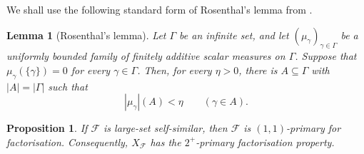 \documentclass[11pt]{amsart}
\theoremstyle{plain}
\newtheorem{lemma}[theorem]{Lemma}
\newtheorem{proposition}[theorem]{Proposition}
\theoremstyle{definition}
\numberwithin{equation}{section}
\begin{document}
We shall use the following standard form of Rosenthal's lemma from \cite{Rosenthal1970}.

\begin{lemma}[Rosenthal's lemma]\label{lem:rosenthal}
Let \(\Gamma\) be an infinite set, and let
\((\mu_\gamma)_{\gamma\in\Gamma}\) be a uniformly bounded family of finitely additive scalar measures on \(\Gamma\).  Suppose that
\(\mu_\gamma(\{\gamma\})=0\) for every \(\gamma\in\Gamma\).  Then, for every \(\eta>0\), there is \(A\subseteq\Gamma\) with \(|A|=|\Gamma|\) such that
\[
    |\mu_\gamma|(A)<\eta
    \qquad(\gamma\in A).
\]
\end{lemma}

\begin{proposition}\label{prop:large-set-self-similar-implies-diagonal-primary}
If \(\mathcal F\) is large-set self-similar, then \(\mathcal F\) is
\((1,1)\)-primary for factorisation. Consequently,
\(X_{\mathcal F}\) has the \(2^+\)-primary factorisation property.
\end{proposition}
\end{document}
